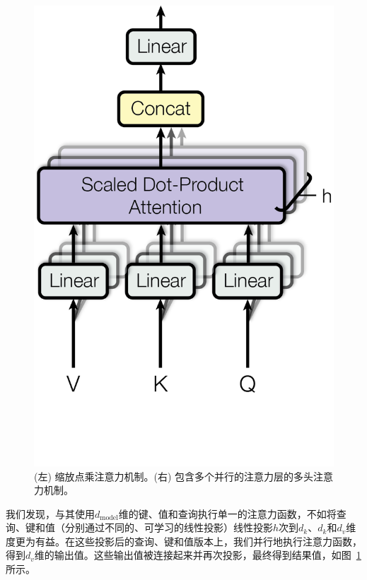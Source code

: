 \documentclass[lang=cn,a4paper,newtx]{elegantpaper}
\newcommand{\dmodel}{d_{\text{model}}}
\begin{document}
\begin{figure}
\begin{minipage}[t]{0.5\textwidth}
  \includegraphics[scale=0.6]{Figures/ModalNet-20}  
\end{minipage}



  \caption{(左) 缩放点乘注意力机制。(右) 包含多个并行的注意力层的多头注意力机制。}
  \label{fig:multi-head-att}
\end{figure}

我们发现，与其使用$\dmodel$维的键、值和查询执行单一的注意力函数，不如将查询、键和值（分别通过不同的、可学习的线性投影）线性投影$h$次到$d_k$、$d_k$和$d_v$维度更为有益。在这些投影后的查询、键和值版本上，我们并行地执行注意力函数，得到$d_v$维的输出值。这些输出值被连接起来并再次投影，最终得到结果值，如图~\ref{fig:multi-head-att}所示。
\end{document}
